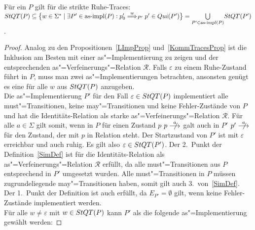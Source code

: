 \begin{Prop}
  \label{RuheTraceProp}
  Für ein \MEIO{} $P$ gilt für die strikte Ruhe-Traces: $\StQT (P) \subseteq
  \big\{w\in\Sigma ^*\mid \exists P'\in\asimp (P): p'_0 \weakmust[w]_{P'}
  p'\in Qui(P')\big\} = \underset{P'\in\asimp (P)}{\bigcup} \StQT (P')$.
\end{Prop}
\begin{proof}
  Analog zu den Propositionen~\ref{LImpProp} und~\ref{KommTracesProp} ist die
  Inklusion am Besten mit einer as"=Implementierung zu zeigen und der
  entsprechenden as"=Verfeinerungs"=Relation $\mathcal{R}$. Falls $\varepsilon$
  zu einem Ruhe-Zustand führt in $P$, muss man zwei as"=Implementierungen
  betrachten, ansonsten genügt es eine für alle $w$ aus $StQT (P)$
  anzugeben.\\
  Die as"=Implementierung $P'$ für den Fall $\varepsilon\in StQT (P)$
  implementiert alle must"=Transitionen, keine may"=Transitionen und keine
  Fehler-Zustände von $P$ und hat die Identitäts-Relation als starke
  as"=Verfeinerungs"=Relation $\mathcal{R}$. Für alle $a\in\Sigma$ gilt somit,
  wenn in $P$ für einen Zustand $p$ $p\nmust[a]$ galt auch in $P'$ $p'
  \nmust[a]$ für den Zustand, der mit $p$ in Relation steht. Der Startzustand
  von $P'$ ist mit $\varepsilon$ erreichbar und auch ruhig. Es gilt also
  $\varepsilon\in StQT (P')$. Der 2.\ Punkt der Definition~\ref{SimDef} ist für
  die Identitäts-Relation als as"=Verfeinerungs"=Relation $\mathcal{R}$
  erfüllt, da alle must"=Transitionen aus $P$ entsprechend in $P'$ umgesetzt
  wurden. Alle must"=Transitionen in $P$ müssen zugrundeliegende
  may"=Transitionen haben, somit gilt auch 3.\ von~\ref{SimDef}. Der 1.\ Punkt
  der Definition ist auch erfüllt, da $E_{P'}=\emptyset$ gilt, wenn keine
  Fehler-Zustände implementiert werden.\\
  Für alle $w\neq \varepsilon$ mit $w\in StQT (P)$ kann $P'$ als die folgende
  as"=Implementierung gewählt werden:
\end{proof}
